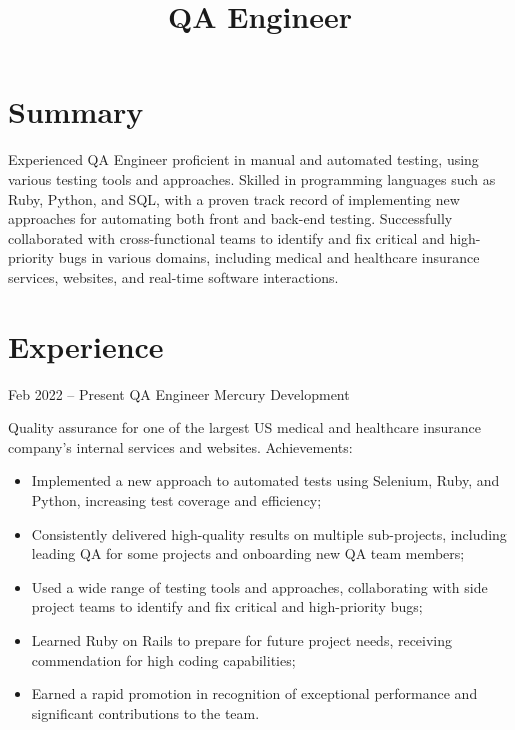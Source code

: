 \documentclass[11pt,a4paper,sans]{moderncv}
\title{QA Engineer}
\begin{document}
\makecvtitle
\vspace{-5mm}
\section{Summary}
Experienced QA Engineer proficient in manual and automated testing, using various testing tools and approaches. Skilled in programming languages such as Ruby, Python, and SQL, with a proven track record of implementing new approaches for automating both front and back-end testing. Successfully collaborated with cross-functional teams to identify and fix critical and high-priority bugs in various domains, including medical and healthcare insurance services, websites, and real-time software interactions.

\section{Experience}
\cventry
{Feb 2022 -- Present}
{QA Engineer}
{Mercury Development}
{}{}
{Quality assurance for one of the largest US medical and healthcare insurance company's internal services and websites. Achievements:
\begin{itemize}
\item Implemented a new approach to automated tests using Selenium, Ruby, and Python, increasing test coverage and efficiency;
\item Consistently delivered high-quality results on multiple sub-projects, including leading QA for some projects and onboarding new QA team members;
\item Used a wide range of testing tools and approaches, collaborating with side project teams to identify and fix critical and high-priority bugs;
\item Learned Ruby on Rails to prepare for future project needs, receiving commendation for high coding capabilities;
\item Earned a rapid promotion in recognition of exceptional performance and significant contributions to the team.
\end{itemize}}
\end{document}
